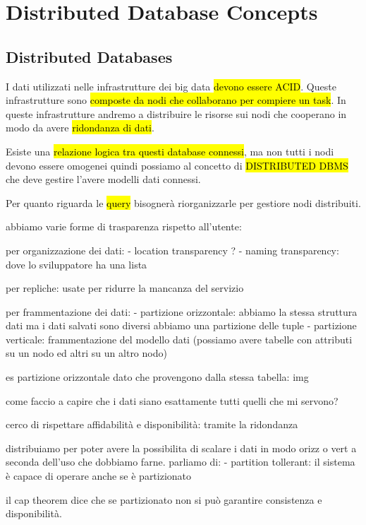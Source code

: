 \newpage
\section{Distributed Database Concepts}

\subsection{Distributed Databases}

I dati utilizzati nelle infrastrutture dei big data \hl{devono essere ACID}. Queste infrastrutture sono \hl{composte da nodi che collaborano per compiere un task}. In queste infrastrutture andremo a distribuire le risorse sui nodi che cooperano in modo da avere \hl{ridondanza di dati}.

Esiste una \hl{relazione logica tra questi database connessi}, ma non tutti i nodi devono essere omogenei quindi possiamo al concetto di \hl{DISTRIBUTED DBMS} che deve gestire l'avere modelli dati connessi. 

Per quanto riguarda le \hl{query} bisognerà riorganizzarle per gestiore nodi distribuiti.

abbiamo varie forme di trasparenza rispetto all'utente:

per organizzazione dei dati:
- location transparency ?
- naming transparency: dove lo sviluppatore ha una lista

per repliche: usate per ridurre la mancanza del servizio

per frammentazione dei dati:
- partizione orizzontale: abbiamo la stessa struttura dati ma i dati salvati sono diversi abbiamo una partizione delle tuple
- partizione verticale: frammentazione del modello dati (possiamo avere tabelle con attributi su un nodo ed altri su un altro nodo)

es partizione orizzontale dato che provengono dalla stessa tabella:
img

come faccio a capire che i dati siano esattamente tutti quelli che mi servono?

cerco di rispettare affidabilità e disponibilità: tramite la ridondanza

distribuiamo per poter avere la possibilita di scalare i dati in modo orizz o vert a seconda dell'uso che dobbiamo farne. parliamo di:
- partition tollerant: il sistema è capace di operare anche se è partizionato

il cap theorem dice che se partizionato non si può garantire consistenza e disponibilità.

